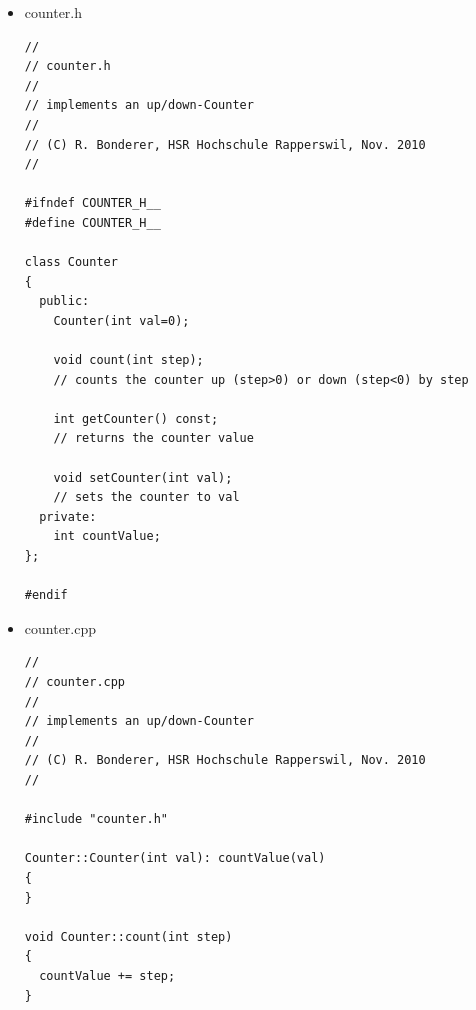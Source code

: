 \begin{itemize}
\begin{lstlisting}
void CountUpState::entryAction(void)
{
  cout << "Enter countUpState" << endl;
}

void CountUpState::exitAction(void)
{
  cout << "Exit from countUpState" << endl;
}

// class CountDownState
CountDownState CountDownState::instance;
CountDownState* CountDownState::getInstance()
{
  return &instance;
}

CounterState* CountDownState::process(CounterCtrl::Event e)
{
  cout << "State: countDownState" << endl;
  if (CounterCtrl::evCount == e)
  {
    // state transition
    return changeState(&CountDownState::countDown, CountDownState::getInstance());
  }
  if (CounterCtrl::evStop == e)
  {
    // state transition
    return changeState(&CountDownState::emptyAction, IdleState::getInstance());
  }
  return this;
}

void CountDownState::entryAction(void)
{
  cout << "Enter countDownState" << endl;
}

void CountDownState::exitAction(void)
{
  cout << "Exit from countDownState" << endl;
}

\end{lstlisting}
\item counter.h
\begin{lstlisting}
//
// counter.h
//
// implements an up/down-Counter
//
// (C) R. Bonderer, HSR Hochschule Rapperswil, Nov. 2010
//

#ifndef COUNTER_H__
#define COUNTER_H__

class Counter
{
  public:
    Counter(int val=0);

    void count(int step);
    // counts the counter up (step>0) or down (step<0) by step

    int getCounter() const;
    // returns the counter value

    void setCounter(int val);
    // sets the counter to val
  private:
    int countValue;
};

#endif

\end{lstlisting}
\item counter.cpp
\begin{lstlisting}
//
// counter.cpp
//
// implements an up/down-Counter
//
// (C) R. Bonderer, HSR Hochschule Rapperswil, Nov. 2010
//

#include "counter.h"

Counter::Counter(int val): countValue(val)
{
}

void Counter::count(int step)
{
  countValue += step;
}


\end{lstlisting}
\end{itemize}
